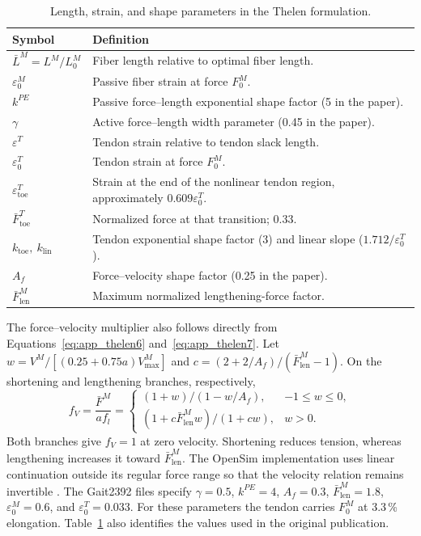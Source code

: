 \begin{table}[htbp]
\centering\small
\caption{Length, strain, and shape parameters in the Thelen formulation.}
\label{tab:app_thelen_symbols}
\begin{tabularx}{\textwidth}{@{}lX@{}}
\toprule
Symbol & Definition \\
\midrule
$\bar L^M=L^M/L_0^M$ & Fiber length relative to optimal fiber length. \\
$\varepsilon_0^M$ & Passive fiber strain at force $F_0^M$. \\
$k^{PE}$ & Passive force--length exponential shape factor (5 in the paper). \\
$\gamma$ & Active force--length width parameter (0.45 in the paper). \\
$\varepsilon^T$ & Tendon strain relative to tendon slack length. \\
$\varepsilon_0^T$ & Tendon strain at force $F_0^M$. \\
$\varepsilon^T_{\mathrm{toe}}$ & Strain at the end of the nonlinear tendon region, approximately $0.609\varepsilon_0^T$. \\
$\bar F^T_{\mathrm{toe}}$ & Normalized force at that transition; 0.33. \\
$k_{\mathrm{toe}},\ k_{\mathrm{lin}}$ & Tendon exponential shape factor (3) and linear slope ($1.712/\varepsilon_0^T$). \\
$A_f$ & Force--velocity shape factor (0.25 in the paper). \\
$\bar F^M_{\mathrm{len}}$ & Maximum normalized lengthening-force factor. \\
\bottomrule
\end{tabularx}
\end{table}

The force--velocity multiplier also follows directly from Equations~\eqref{eq:app_thelen6} and~\eqref{eq:app_thelen7}. Let $w=V^M/[(0.25+0.75a)V^M_{\max}]$ and $c=(2+2/A_f)/(\bar F^M_{\mathrm{len}}-1)$. On the shortening and lengthening branches, respectively,
\begin{equation}
 f_V=\frac{\bar F^M}{a f_l}=\begin{cases}
 (1+w)/(1-w/A_f),&-1\leq w\leq0,\\
 (1+c\bar F^M_{\mathrm{len}}w)/(1+cw),&w>0.
 \end{cases}
 \label{eq:app_thelen_velocity_multiplier}
\end{equation}
Both branches give $f_V=1$ at zero velocity. Shortening reduces tension, whereas lengthening increases it toward $\bar F^M_{\mathrm{len}}$. The OpenSim implementation uses linear continuation outside its regular force range so that the velocity relation remains invertible \citep{opensim_muscle_curves_44}. The Gait2392 files specify $\gamma=0.5$, $k^{PE}=4$, $A_f=0.3$, $\bar F^M_{\mathrm{len}}=1.8$, $\varepsilon_0^M=0.6$, and $\varepsilon_0^T=0.033$. For these parameters the tendon carries $F_0^M$ at 3.3\,\% elongation. Table~\ref{tab:app_thelen_symbols} also identifies the values used in the original publication.

